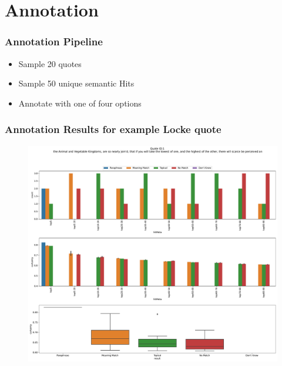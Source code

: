\documentclass[pdf]{beamer}
\begin{document}
\section{Annotation}

\begin{frame}
  \frametitle{Annotation Pipeline}
  
  \begin{itemize}
    \item<only@2> Sample 20 quotes
    \item<only@3> Sample 50 unique semantic Hits 
    \item<only@4> Annotate with one of four options

  \end{itemize}
\end{frame}

\begin{frame}
  \frametitle{Annotation Results for example Locke quote}
  \begin{figure}
    \centering
    \includegraphics[width=\linewidth,height=\textheight,keepaspectratio,clip,trim={0 8cm 0 0}]{images/quote_1_annotation_results.pdf}
  \end{figure}
\end{frame}
\end{document}
